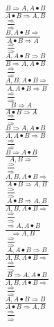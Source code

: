 \documentclass[11pt]{article}
\begin{document}
\begin{center}

$\frac{B\Rightarrow A, A\bullet B}{A\bullet B\Rightarrow A, B}$
\bigskip
\\$\frac{\Rightarrow }{\Rightarrow }$
\bigskip
\\$\frac{B, A\bullet B\Rightarrow }{A\bullet B\Rightarrow A}$
\bigskip
\\$\frac{\Rightarrow }{\Rightarrow }$
\bigskip
\\$\frac{A, A\bullet B\Rightarrow B}{B\Rightarrow A, A\bullet B}$
\bigskip
\\$\frac{\Rightarrow }{\Rightarrow }$
\bigskip
\\$\frac{A, B, A\bullet B\Rightarrow }{A, A\bullet B\Rightarrow B}$
\bigskip
\\$\frac{\Rightarrow }{\Rightarrow }$
\bigskip
\\$\frac{B\Rightarrow A}{A\bullet B\Rightarrow A}$
\bigskip
\\$\frac{\Rightarrow }{\Rightarrow }$
\bigskip
\\$\frac{B\Rightarrow A, A\bullet B}{A, A\bullet B\Rightarrow B}$
\bigskip
\\$\frac{\Rightarrow }{\Rightarrow }$
\bigskip
\\$\frac{B\Rightarrow A\bullet B}{A, B\Rightarrow }$
\bigskip
\\$\frac{\Rightarrow }{\Rightarrow }$
\bigskip
\\$\frac{A, B, A\bullet B\Rightarrow }{A\bullet B\Rightarrow A, B}$
\bigskip
\\$\frac{\Rightarrow }{\Rightarrow }$
\bigskip
\\$\frac{A\bullet B\Rightarrow A, B}{A, B, A\bullet B\Rightarrow }$
\bigskip
\\$\frac{\Rightarrow }{\Rightarrow }$
\bigskip
\\$\frac{\Rightarrow A, A\bullet B}{\Rightarrow A, B}$
\bigskip
\\$\frac{\Rightarrow }{\Rightarrow }$
\bigskip
\\$\frac{A, A\bullet B\Rightarrow B}{A, B, A\bullet B\Rightarrow }$
\bigskip
\\$\frac{\Rightarrow }{\Rightarrow }$
\bigskip
\\$\frac{B\Rightarrow A, A\bullet B}{A, B, A\bullet B\Rightarrow }$
\bigskip
\\$\frac{\Rightarrow }{\Rightarrow }$
\bigskip
\\$\frac{A, A\bullet B\Rightarrow B}{A\bullet B\Rightarrow A, B}$
\bigskip
\\$\frac{\Rightarrow }{\Rightarrow }$

\end{center}
\end{document}
